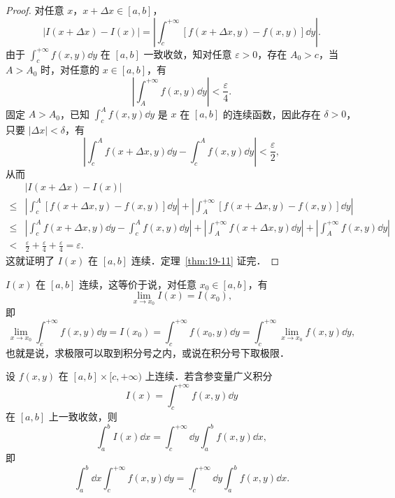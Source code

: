 \begin{proof}
对任意 $x$，$x+\Delta x\in[a,b]$，
\[
|I(x+\Delta x)-I(x)|=\left|\int_{c}^{+\infty}\left[f(x+\Delta x,y)-f(x,y)\right]\dd y\right|.
\]
由于 $\displaystyle\int_{c}^{+\infty}f(x,y)\dd y$ 在 $[a,b]$ 一致收敛，知对任意 $\varepsilon>0$，存在 $A_{0}>c$，当 $A>A_{0}$ 时，对任意的 $x\in[a,b]$，有
\[
\left|\int_{A}^{+\infty}f(x,y)\dd y\right|<\frac{\varepsilon}{4}.
\]
固定 $A>A_{0}$，已知 $\displaystyle\int_{c}^{A}f(x,y)\dd y$ 是 $x$ 在 $[a,b]$ 的连续函数，因此存在 $\delta>0$，只要 $|\Delta x|<\delta$，有
\[
\left|\int_{c}^{A}f(x+\Delta x,y)\dd y-\int_{c}^{A}f(x,y)\dd y\right|<\frac{\varepsilon}{2},
\]
从而
\[
\begin{aligned}
&|I(x+\Delta x)-I(x)|\\
\leqslant{}&\left|\int_{c}^{A}\left[f(x+\Delta x,y)-f(x,y)\right]\dd y\right|+\left|\int_{A}^{+\infty}\left[f(x+\Delta x,y)-f(x,y)\right]\dd y\right|\\
\leqslant{}&\left|\int_{c}^{A}f(x+\Delta x,y)\dd y-\int_{c}^{A}f(x,y)\dd y\right|+\left|\int_{A}^{+\infty}f(x+\Delta x,y)\dd y\right|+\left|\int_{A}^{+\infty}f(x,y)\dd y\right|\\
<{}&\frac{\varepsilon}{2}+\frac{\varepsilon}{4}+\frac{\varepsilon}{4}=\varepsilon.
\end{aligned}
\]
这就证明了 $I(x)$ 在 $[a,b]$ 连续．定理~\ref{thm:19-11} 证完．
\end{proof}

$I(x)$ 在 $[a,b]$ 连续，这等价于说，对任意 $x_{0}\in[a,b]$，有
\[
\lim_{x\to x_{0}}I(x)=I(x_{0}),
\]
即
\[
\lim_{x\to x_{0}}\int_{c}^{+\infty}f(x,y)\dd y=I(x_{0})=\int_{c}^{+\infty}f(x_{0},y)\dd y=\int_{c}^{+\infty}\lim_{x\to x_{0}}f(x,y)\dd y,
\]
也就是说，求极限可以取到积分号之内，或说在积分号下取极限．

\begin{theorem}[积分交换次序]\label{thm:19-12}
设 $f(x,y)$ 在 $[a,b]\times[c,+\infty)$ 上连续．若含参变量广义积分
\[
I(x)=\int_{c}^{+\infty}f(x,y)\dd y
\]
在 $[a,b]$ 上一致收敛，则
\[
\int_{a}^{b}I(x)\dd x=\int_{c}^{+\infty}\dd y\int_{a}^{b}f(x,y)\dd x,
\]
即
\[
\int_{a}^{b}\dd x\int_{c}^{+\infty}f(x,y)\dd y=\int_{c}^{+\infty}\dd y\int_{a}^{b}f(x,y)\dd x.
\]
\end{theorem}


